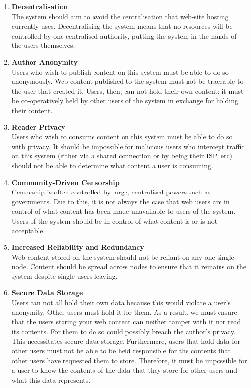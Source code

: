\begin{enumerate}

    \item{\textbf{Decentralisation} \\
The system should aim to avoid the centralisation that web-site hosting currently uses.
Decentralising the system means that no resources will be controlled by one centralised
authority, putting the system in the hands of the users themselves.
        }

    \item{\textbf{Author Anonymity} \\
Users who wish to publish content on this system must be able to do so anonymously.
Web content published to the system must not be traceable to the user that created it.
Users, then, can not hold their own content: it must be co-operatively held by other
users of the system in exchange for holding their content.
        }

    \item{\textbf{Reader Privacy} \\
Users who wish to consume content on this system must be able to do so with privacy.
It should be impossible for malicious users who intercept traffic on this system
(either via a shared connection or by being their ISP,  etc) should not be able to
determine what content a user is consuming.
        }

    \item{\textbf{Community-Driven Censorship} \\
Censorship is often controlled by large, centralised powers such as governments.
Due to this, it is not always the case that web users are in control of what content
has been made unavailable to users of the system. Users of the system should be
in control of what content is or is not acceptable.
        }

    \item{\textbf{Increased Reliability and Redundancy} \\
Web content stored on the system should not be reliant on any one single node.
Content should be spread across nodes to ensure that it remains on the system despite
single users leaving.
        }

    \item{\textbf{Secure Data Storage} \\
Users can not all hold their own data because this would violate a user's anonymity.
Other users must hold it for them. As a result, we must ensure that the users storing
your web content can neither tamper with it nor read its contents. For them to do so could
possibly breach the author’s privacy. This necessitates secure data storage.
Furthermore, users that hold data for other users must not be able to be held responsible
for the contents that other users have requested them to store. Therefore, it must be
impossible for a user to know the contents of the data that they store for other users
and what this data represents.
        }
\end{enumerate}
